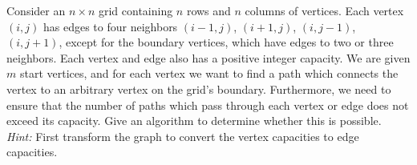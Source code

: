 \problem{}
Consider an $n \times n$ grid containing $n$ rows and $n$ columns of vertices.  Each vertex $(i, j)$ has edges to four neighbors $(i-1, j)$, $(i+1, j)$, $(i, j-1)$, $(i, j+1)$, except for the boundary vertices, which have edges to two or three neighbors.  Each vertex and edge also has a positive integer capacity.  We are given $m $ start vertices, and for each vertex we want to find a path which connects the vertex to an arbitrary vertex on the grid's boundary.  Furthermore, we need to ensure that the number of paths which pass through each vertex or edge does not exceed its capacity.  Give an algorithm to determine whether this is possible. \\

\noindent \emph{Hint:}  First transform the graph to convert the vertex capacities to edge capacities.  

\solution{
}

\newpage